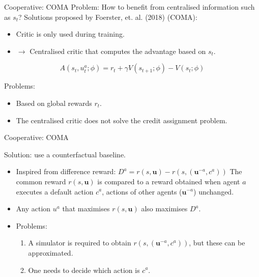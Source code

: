 \documentclass[9pt, hyperref={pdfusetitle,colorlinks=true,allcolors=DarkBlue}]{beamer}
\begin{document}
\begin{frame}{Cooperative: COMA}
Problem: How to benefit from centralised information such as $s_t$?
\vfill
Solutions proposed by Foerster, et. al. (2018) (COMA):
\begin{itemize}
    \item Critic is only used during training.
    \item $\rightarrow$ Centralised critic that computes the advantage based on $s_t$.
\end{itemize}

\begin{equation*}
    A(s_t,u^a_t; \phi) = r_t + \gamma V(s_{t+1}; \phi) - V(s_t; \phi)
\end{equation*}

\vfill

Problems: 
\begin{itemize}
    \item Based on global rewards $r_t$.
    \item The centralised critic does not solve the credit assignment problem.
\end{itemize}
\vfill

\end{frame}
\begin{frame}{Cooperative: COMA}

Solution: use a counterfactual baseline.
\vfill
\begin{itemize}
    \item Inspired from difference reward: 
    \vfill
    $D^a=r(s, \bm{u}) - r(s, (\bm{u}^{-a}, c^a))$
    \vfill
    The common reward $r(s, \bm{u})$ is compared to a reward obtained when agent $a$ executes a default action $c^a$, actions of other agents ($\bm{u}^{-a}$) unchanged.
    \vfill
    \item Any action $u^a$ that maximises $r(s, \bm{u})$ also maximises $D^a$.
    \vfill
    \item Problems:
    \begin{enumerate}
        \item A simulator is required to obtain $r(s, (\bm{u}^{-a}, c^a))$, but these can be approximated.
        \item One needs to decide which action is $c^a$.
    \end{enumerate}
\end{itemize}

\end{frame}
\end{document}
